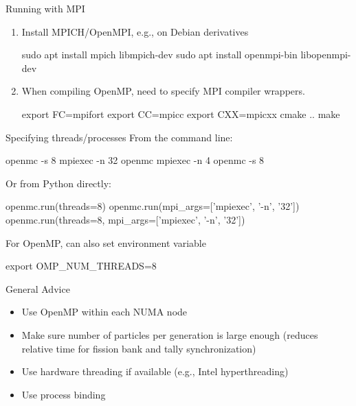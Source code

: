 \documentclass[noamssymb,svgnames]{beamer}
\begin{document}
\begin{frame}[fragile]{Running with MPI}
  \begin{enumerate}
  \item Install MPICH/OpenMPI, e.g., on Debian derivatives
  \begin{shell}
    sudo apt install mpich libmpich-dev
    sudo apt install openmpi-bin libopenmpi-dev
  \end{shell}
  \item When compiling OpenMP, need to specify MPI compiler wrappers.
    \begin{shell}
      export FC=mpifort
      export CC=mpicc
      export CXX=mpicxx
      cmake ..
      make
    \end{shell}
  \end{enumerate}
\end{frame}

\begin{frame}[fragile]{Specifying threads/processes}
  From the command line:
  \begin{shell}
    openmc -s 8
    mpiexec -n 32 openmc
    mpiexec -n 4 openmc -s 8
  \end{shell}
  \vfill
  Or from Python directly:
  \begin{python}[minted options={fontsize=\scriptsize}]
    openmc.run(threads=8)
    openmc.run(mpi_args=['mpiexec', '-n', '32'])
    openmc.run(threads=8, mpi_args=['mpiexec', '-n', '32'])
  \end{python}
  \vfill
  For OpenMP, can also set environment variable
  \begin{shell}
    export OMP_NUM_THREADS=8
  \end{shell}
\end{frame}

\begin{frame}{General Advice}
  \begin{itemize}
  \item Use OpenMP within each NUMA node
  \item Make sure number of particles per generation is large enough (reduces
    relative time for fission bank and tally synchronization)
  \item Use hardware threading if available (e.g., Intel hyperthreading)
  \item Use process binding
  \end{itemize}
\end{frame}
\end{document}
